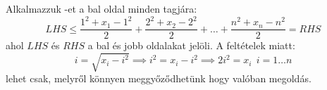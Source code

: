    Alkalmazzuk -et a bal oldal minden tagjára:
   $$
      LHS\le 
      \frac{1^{2}+x_{1}-1^{2}}{2}+\frac{2^{2}+x_{2}-2^{2}}{2}+\hdots+
      \frac{n^{2}+x_{n}-n^{2}}{2}=
      RHS
   $$
   ahol $LHS$ és $RHS$ a bal és jobb oldalakat jelöli. A feltételek miatt:
   $$
      i=\sqrt{x_{i}-i^{2}} \implies
      i^{2}=x_{i}-i^{2}  \implies
      2i^{2}=x_{i} \ \ i=1\hdots n
   $$
   lehet csak, melyről könnyen meggyőződhetünk hogy valóban megoldás.
